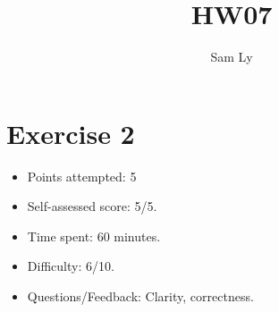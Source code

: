 \documentclass{article}
\title{HW07}
\author{Sam Ly}
\begin{document}
\maketitle

\section*{Exercise 2}
\begin{itemize}
  \item Points attempted: 5
  \item Self-assessed score: 5/5.
  \item Time spent: 60 minutes.
  \item Difficulty: 6/10.
  \item Questions/Feedback: Clarity, correctness.
\end{itemize}
\end{document}
